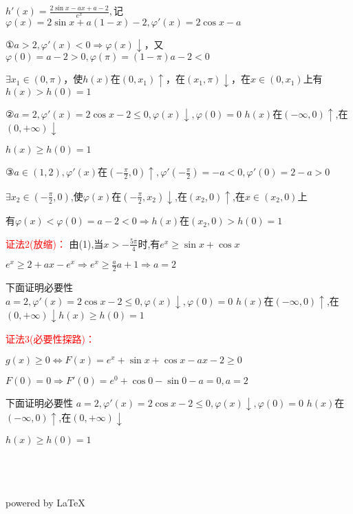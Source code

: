 \documentclass[a4paper,12pt]{article}
\begin{document}
\begin{flushleft}
$h'(x) = \frac{{2\sin x - ax + a - 2}}{{{e^x}}},$记$\varphi (x) = 2\sin x + a(1 - x) - 2,\varphi '(x) = 2\cos x - a$

①$a > 2,\varphi '(x) < 0 \Rightarrow \varphi (x) \downarrow $，又$\varphi (0) = a - 2 > 0,\varphi (\pi ) = (1 - \pi )a - 2 < 0$

$\exists {x_1} \in (0,\pi )$，使$h(x)$在$(0,x_1)\uparrow$，在$(x_1,\pi)\downarrow$，在$x\in(0,x_1)$上有$h(x)>h(0)=1$

②$a = 2,\varphi '(x) = 2\cos x - 2 \le 0,\varphi (x) \downarrow ,\varphi (0) = 0$ $h(x)$在$(-\infty,0)\uparrow$,在$(0,+\infty)\downarrow$

$h(x)\ge h(0)=1$

③$a \in (1,2),\varphi '(x)$在$\left( { - \frac{\pi }{2},0} \right) \uparrow ,\varphi '\left( { - \frac{\pi }{2}} \right) =  - a < 0,\varphi '\left( 0 \right) = 2 - a > 0$

$\exists {x_2} \in \left( { - \frac{\pi }{2},0} \right)$,使$\varphi(x)$在$\left( { - \frac{\pi }{2},x_2} \right)\downarrow$,在$(x_2,0)\uparrow$,在$x\in(x_2,0)$上

有$\varphi(x)<\varphi(0)=a-2<0\Rightarrow h(x)$在$(x_2,0)>h(0)=1$

\textcolor{red}{证法2(放缩)：}
由(1),当$x>-\frac{5 \pi}{4} $时,有$e^x \ge \sin x + \cos x $

${e^x} \ge 2 + ax - {e^x} \Rightarrow {e^x} \ge \frac{a}{2}a + 1 \Rightarrow a = 2$

下面证明必要性\\
$a = 2,\varphi '(x) = 2\cos x - 2 \le 0,\varphi (x) \downarrow ,\varphi (0) = 0$ $h(x)$在$(-\infty,0)\uparrow$,在$(0,+\infty)\downarrow h(x)\ge h(0)=1$

\textcolor{red}{证法3(必要性探路)：}

$g(x) \ge 0 \Leftrightarrow F(x) = {e^x} + \sin x + \cos x - ax - 2 \ge 0 $ 

$  F(0) = 0 \Rightarrow F'(0) = {e^0} + \cos 0 - \sin 0 - a = 0,a = 2$

下面证明必要性
$a = 2,\varphi '(x) = 2\cos x - 2 \le 0,\varphi (x) \downarrow ,\varphi (0) = 0$ $h(x)$在$(-\infty,0)\uparrow$,在$(0,+\infty)\downarrow$

$h(x)\ge h(0)=1$
\end{flushleft}
\begin{flushright}
~\\
~\\
~\\
powered by \LaTeX
\end{flushright}
\end{document}
